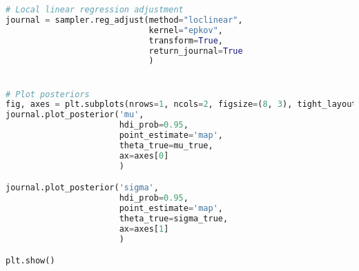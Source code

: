 \begin{lstlisting}[language=python, label={lst:pylfi}, caption={Example usage of the pyLFI on a Gaussian toy model.}]
# Local linear regression adjustment
journal = sampler.reg_adjust(method="loclinear",
                             kernel="epkov",
                             transform=True,
                             return_journal=True
                             )


# Plot posteriors
fig, axes = plt.subplots(nrows=1, ncols=2, figsize=(8, 3), tight_layout=True)
journal.plot_posterior('mu',
                       hdi_prob=0.95,
                       point_estimate='map',
                       theta_true=mu_true,
                       ax=axes[0]
                       )

journal.plot_posterior('sigma',
                       hdi_prob=0.95,
                       point_estimate='map',
                       theta_true=sigma_true,
                       ax=axes[1]
                       )

plt.show()
\end{lstlisting}







